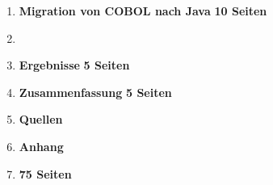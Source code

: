 \begin{framed}
\begin{enumerate}[label=\arabic*.]
    \item   \textbf{Migration von COBOL nach Java}                      \dotfill \textbf{10 Seiten}

    \item[]                                                             \dotfill
    
    \item   \textbf{Ergebnisse}                                         \dotfill \textbf{5 Seiten}
    \item   \textbf{Zusammenfassung}                                    \dotfill \textbf{5 Seiten}
    \item[] \textbf{Quellen}
    \item[] \textbf{Anhang}
    \item[]                                                             \hfill \textbf{75 Seiten}
\end{enumerate}
\end{framed}